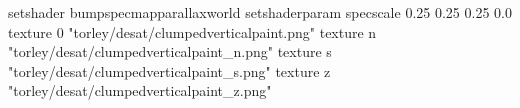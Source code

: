 setshader bumpspecmapparallaxworld
setshaderparam specscale 0.25 0.25 0.25 0.0
texture 0 "torley/desat/clumpedverticalpaint.png"
texture n "torley/desat/clumpedverticalpaint_n.png"
texture s "torley/desat/clumpedverticalpaint_s.png"
texture z "torley/desat/clumpedverticalpaint_z.png"

